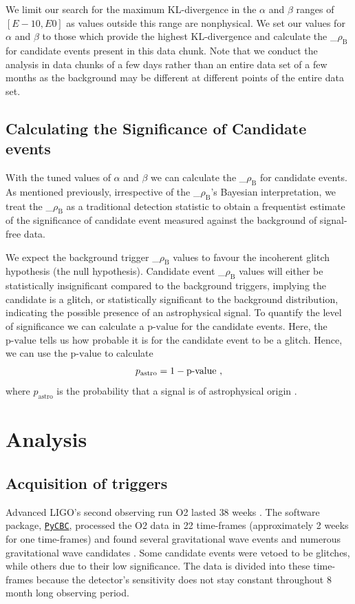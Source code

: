 \documentclass[%
 amsmath,amssymb,
 aps,
twocolumn
]{revtex4}
\newcommand{\pycbc}{{\sc \href{https://pycbc.org/}{\texttt{PyCBC}}}\xspace}
\newcommand{\mathcmd}[1]{{\sc \relax\ifmmode#1\else $#1$\fi}\xspace}
\newcommand{\bcr}{\mathcmd{\rho_\text{B}}}
\newcommand{\pastro}{\relax\ifmmode{p_\text{astro}}\else $p_\text{astro}$\fi\xspace}
\newcommand{\pval}{\relax\ifmmode{\text{p-value}}\else $\text{p-value}$\fi\xspace}
\begin{document}
We limit our search for the maximum KL-divergence in the $\alpha$ and $\beta$ ranges of $[E-10, E0]$ as values outside this range are nonphysical. We set our values for $\alpha$ and $\beta$ to those which provide the highest KL-divergence and calculate the \bcr for candidate events present in this data chunk. Note that we conduct the analysis in data chunks of a few days rather than an entire data set of a few months as the background may be different at different points of the entire data set.

\subsection{Calculating the Significance of Candidate events}
With the tuned values of $\alpha$ and $\beta$ we can calculate the \bcr for candidate events. As mentioned previously, irrespective of the \bcr's Bayesian interpretation, we treat the \bcr as a traditional detection statistic to obtain a frequentist estimate of the significance of candidate event measured against the background of signal-free data. 

We expect the background trigger \bcr values to favour the incoherent glitch hypothesis (the null hypothesis). Candidate event \bcr values will either be statistically insignificant compared to the background triggers, implying the candidate is a glitch, or statistically significant to the background distribution, indicating the possible presence of an astrophysical signal. To quantify the level of significance we can calculate a \pval for the candidate events. Here, the \pval tells us how probable it is for the candidate event to be a glitch. Hence, we can use the  \pval to calculate
\begin{equation}
    \pastro = 1 -  \pval \ ,
\end{equation}
where \pastro is the probability that a signal is of astrophysical origin \cite{pastro_1,pastro_2,pastro_3}.


\section{Analysis}\label{sec:Analysis}

\subsection{Acquisition of triggers}
Advanced LIGO's second observing run O2 lasted $38$ weeks \cite{GWOSC}. The software package, \pycbc \cite{pycbc_code}, processed the O2 data in 22 time-frames (approximately 2 weeks for one time-frames) and found several gravitational wave events and numerous gravitational wave candidates \cite{pycbc_og0, pycbc_og1, pycbc_og2, pycbc_og3, pycbc_og4, pycbc_og5}. Some candidate events were vetoed to be glitches, while others due to their low significance. The data is divided into these time-frames because the detector's sensitivity does not stay constant throughout 8 month long observing period.
\end{document}
